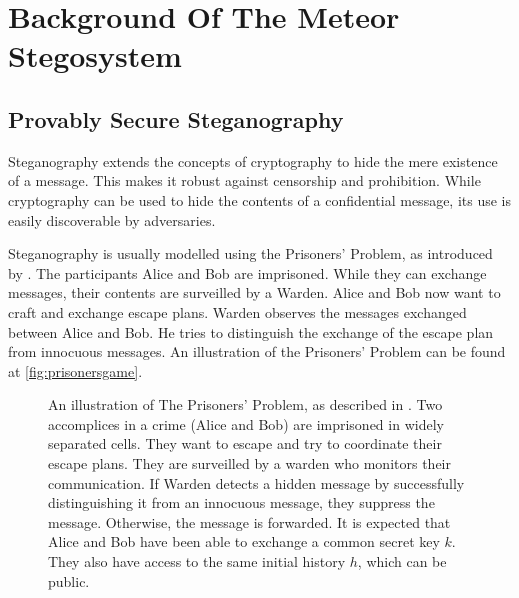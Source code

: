\chapter{Background Of The Meteor Stegosystem}
\label{chap:previous-work}

\section{Provably Secure Steganography}
\label{sec:prov-sec-steg}

Steganography extends the concepts of cryptography to hide the mere existence of a message.
This makes it robust against censorship and prohibition.
While cryptography can be used to hide the contents of a confidential message, its use is easily discoverable by adversaries.


Steganography is usually modelled using the Prisoners' Problem, as introduced by \cite{Simmons1983}.
The participants Alice and Bob are imprisoned.
While they can exchange messages, their contents are surveilled by a Warden.
Alice and Bob now want to craft and exchange escape plans.
Warden observes the messages exchanged between Alice and Bob.
He tries to distinguish the exchange of the escape plan from innocuous messages.
An illustration of the Prisoners' Problem can be found at \autoref{fig:prisonersgame}.

\begin{figure}[htbp]
\centering
{}
\caption{
An illustration of The Prisoners' Problem, as described in \cite{Simmons1983}.
Two accomplices in a crime (Alice and Bob) are imprisoned in widely separated cells.
They want to escape and try to coordinate their escape plans.
They are surveilled by a warden who monitors their communication.
If Warden detects a hidden message by successfully distinguishing it from an innocuous message, they suppress the message.
Otherwise, the message is forwarded.
It is expected that Alice and Bob have been able to exchange a common secret key $k$.
They also have access to the same initial history $h$, which can be public.
}
\label{fig:prisonersgame}
\end{figure}

